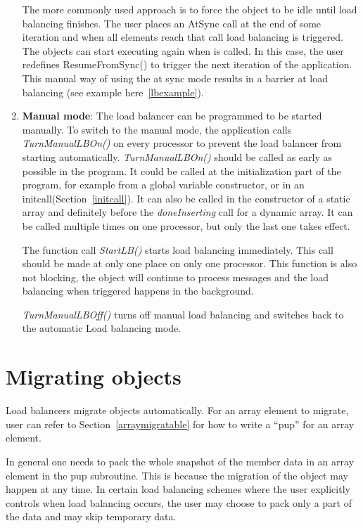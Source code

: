 \begin{enumerate}
The more commonly used approach is to force the object to be idle until load
balancing finishes. The user places an AtSync call at the end of some iteration
and when all elements reach that call load balancing is triggered. The objects
can start executing again when  is called. In this case,
the user redefines ResumeFromSync() to trigger the next iteration of the
application. This manual way of using the at sync mode results in a barrier at
load balancing (see example here~\ref{lbexample}).
%
\item {\bf Manual mode}: The load balancer can be programmed to be started
manually. To switch to the manual mode, the application calls {\em TurnManualLBOn()}
on every processor to prevent the load balancer from starting automatically. {\em
TurnManualLBOn()} should be called as early as possible in the program. It
could be called at the initialization part of the program, for example from a
global variable constructor, or in an initcall(Section~\ref{initcall}).  It can also be
called in the constructor of a static array and definitely before the {\em
doneInserting} call for a dynamic array.  It can be called multiple times on
one processor, but only the last one takes effect.

The function call {\em StartLB()} starts load balancing immediately. This call
should be made at only one place on only one processor. This function is also
not blocking, the object will continue to process messages and the load
balancing when triggered happens in the background.

{\em TurnManualLBOff()} turns off manual load balancing and switches back to
the automatic Load balancing mode.
%
\end{enumerate}

\section{Migrating objects}
\label{lbmigobj}

Load balancers migrate objects automatically.
For an array element to migrate, user can refer to Section~\ref{arraymigratable}
for how to write a ``pup'' for an array element.

In general one needs to pack the whole snapshot of the member data in an 
array element in the pup subroutine. This is because the migration of
the object may happen at any time. In certain load balancing schemes where
 the user explicitly controls when load balancing occurs, the user may choose
to pack only a part of the data and may skip temporary data.

